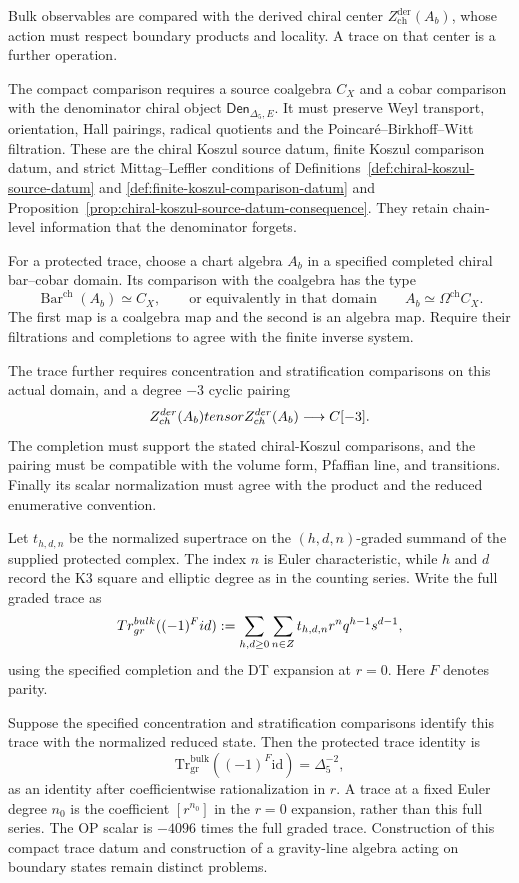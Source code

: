 Bulk observables are compared with the derived
chiral center \(Z^{\mathrm{der}}_{\mathrm{ch}}(A_b)\), whose action
must respect boundary products and locality. A trace on that center
is a further operation.

The compact comparison requires a source coalgebra \(C_X\)
and a cobar comparison with the denominator chiral object
\(\mathsf{Den}_{\Delta_5,E}\).
It must preserve Weyl transport, orientation, Hall pairings,
radical quotients and the Poincar\'e--Birkhoff--Witt filtration.
These are the chiral Koszul
source datum, finite Koszul comparison datum, and strict
Mittag--Leffler conditions of
Definitions~\ref{def:chiral-koszul-source-datum} and
\ref{def:finite-koszul-comparison-datum} and
Proposition~\ref{prop:chiral-koszul-source-datum-consequence}.
They retain chain-level information that the denominator forgets.

For a protected trace, choose a chart algebra $A_b$ in a specified
completed chiral bar--cobar domain.
Its comparison with the coalgebra has the type
\[
 \operatorname{Bar}^{\mathrm{ch}}(A_b)\simeq C_X,
 \qquad\text{or equivalently in that domain}\qquad
 A_b\simeq\Omega^{\mathrm{ch}}C_X.
\]
The first map is a coalgebra map and the second is an algebra map.
Require their filtrations and completions to agree with the
finite inverse system.

The trace further requires concentration and stratification
comparisons on this actual domain, and a degree $-3$ cyclic pairing
\[
 Z^{der}_{ch}(A_b)tensor
 Z^{der}_{ch}(A_b)\longrightarrow C[-3].
\]
The completion must support the stated chiral-Koszul comparisons,
and the pairing must be compatible with the volume form,
Pfaffian line, and transitions. Finally its scalar normalization
must agree with the product and the reduced enumerative convention.

Let \(t_{h,d,n}\) be the normalized supertrace on the
\((h,d,n)\)-graded summand of the supplied protected complex.
The index \(n\) is Euler characteristic, while \(h\) and \(d\)
record the K3 square and elliptic degree as in the counting series.
Write the full graded trace as
\[
 Tr^{bulk}_{gr}
 ((-1)^Fid)
 :=\sum_{h,d\geq0}\sum_{n\in Z}
 t_{h,d,n}r^nq^{h-1}s^{d-1},
\]
using the specified completion and the DT expansion at \(r=0\).
Here \(F\) denotes parity.

Suppose the specified concentration and stratification comparisons
identify this trace with the normalized reduced state.
Then the protected trace identity is
\[
 \mathrm{Tr}^{\mathrm{bulk}}_{\mathrm{gr}}
 ((-1)^F\mathrm{id})=\Delta_5^{-2},
\]
as an identity after coefficientwise rationalization in \(r\).
A trace at a fixed Euler degree \(n_0\) is the coefficient
\([r^{n_0}]\) in the \(r=0\) expansion, rather than this full
series. The OP scalar is \(-4096\) times the full graded trace.
Construction of this compact trace datum and construction of a
gravity-line algebra acting on boundary states remain distinct
problems.

